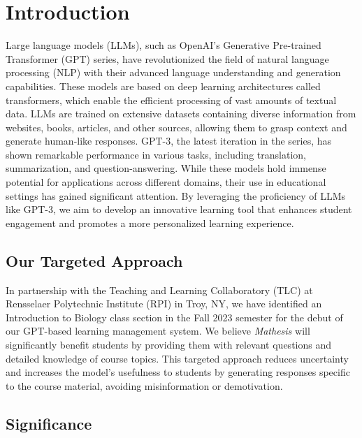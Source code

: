 \documentclass[12pt,a4paper]{article}
\begin{document}
    \pagebreak

    \section{Introduction}

    Large language models (LLMs), such as OpenAI's Generative Pre-trained Transformer (GPT) series,
    have revolutionized the field of natural language processing (NLP) with their advanced language
    understanding and generation capabilities. These models are based on deep learning architectures
    called transformers, which enable the efficient processing of vast amounts of textual data. LLMs
    are trained on extensive datasets containing diverse information from websites, books, articles,
    and other sources, allowing them to grasp context and generate human-like responses. GPT-3, the
    latest iteration in the series, has shown remarkable performance in various tasks, including
    translation, summarization, and question-answering. While these models hold immense potential
    for applications across different domains, their use in educational settings has gained significant
    attention. By leveraging the proficiency of LLMs like GPT-3, we aim to develop an innovative
    learning tool that enhances student engagement and promotes a more personalized learning experience.

    \subsection{Our Targeted Approach}

    In partnership with the Teaching and Learning Collaboratory (TLC) at Rensselaer Polytechnic
    Institute (RPI) in Troy, NY, we have identified an Introduction to Biology class section in the
    Fall 2023 semester for the debut of our GPT-based learning management system. We believe \textit{Mathesis}
    will significantly benefit students by providing them with relevant questions and detailed
    knowledge of course topics. This targeted approach reduces uncertainty and increases the model's
    usefulness to students by generating responses specific to the course material, avoiding
    misinformation or demotivation.

    \subsection{Significance}
\end{document}
